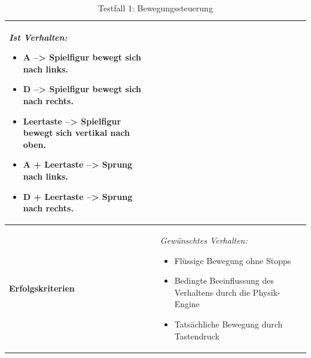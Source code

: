 \begin{table}
\begin{tabular}{|p{3.5cm}|p{11cm}|}
	
	\textit{Ist Verhalten:}
	\begin{itemize}
		\setlength{\itemsep}{1pt}
		\setlength{\parskip}{0.5pt}
		\item A --> Spielfigur bewegt sich nach links.
		\item D --> Spielfigur bewegt sich nach rechts.
		\item Leertaste --> Spielfigur bewegt sich vertikal nach oben.
		\item 	A + Leertaste --> Sprung nach links.
		\item D + Leertaste --> Sprung nach rechts.
	\end{itemize}\\ 
	\hline 
	\textbf{Erfolgskriterien} & 
	\textit{Gewünschtes Verhalten:}
	\begin{itemize}
		\setlength{\itemsep}{1pt}
		\setlength{\parskip}{0.5pt}
		\item Flüssige Bewegung ohne Stopps
		\item Bedingte Beeinflussung des Verhaltens durch die Physik-Engine
		\item Tatsächliche Bewegung durch Tastendruck
	\end{itemize} \\ 
	\hline 
\end{tabular} 
\caption{Testfall 1: Bewegungssteuerung}
\end{table}

